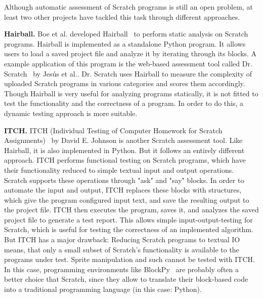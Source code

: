 Although automatic assessment of Scratch programs is still an open problem,
at least two other projects have tackled this task through different approaches.
\parspace

\textbf{Hairball.}
Boe et al. developed Hairball~\cite{hairball} to perform static analysis on Scratch programs.
Hairball is implemented as a standalone Python program.
It allows users to load a saved project file and analyze it by iterating through its blocks.
A example application of this program is the web-based assessment tool called Dr. Scratch~\cite{drscratch} by Jes\'{u}s et al..
Dr. Scratch uses Hairball to measure the complexity of uploaded Scratch programs in various categories and scores them accordingly.
Though Hairball is very useful for analyzing programs statically, it is not fitted to test the functionality and the correctness of a program.
In order to do this, a dynamic testing approach is more suitable.
\parspace

\textbf{ITCH.}
ITCH (Individual Testing of Computer Homework for Scratch Assignments)~\cite{itch} by David E. Johnson is another Scratch assessment tool.
Like Hairball, it is also implemented in Python.
But it follows an entirely different approach.
ITCH performs functional testing on Scratch programs, which have their functionality reduced to simple textual input and output operations.
Scratch supports these operations through "ask" and "say" blocks.
In order to automate the input and output, ITCH replaces these blocks with structures, which give the program configured input text, and save the resulting output to the project file.
ITCH then executes the program, saves it, and analyzes the saved project file to generate a test report.
This allows simple input-output-testing for Scratch, which is useful for testing the correctness of an implemented algorithm.
But ITCH has a major drawback: Reducing Scratch programs to textual IO means, that only a small subset of Scratch's functionality is available to the programs under test.
Sprite manipulation and such cannot be tested with ITCH.
In this case, programming environments like BlockPy~\cite{blockpy} are probably often a better choice that Scratch,
since they allow to translate their block-based code into a traditional programming language (in this case: Python).

